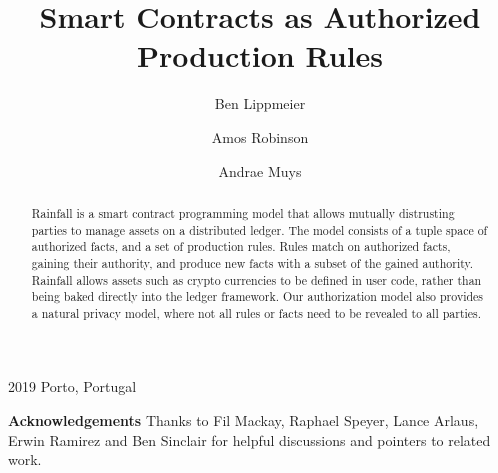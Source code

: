 \documentclass[format=sigconf, review=true, screen=true]{acmart}
\begin{document}
        {2019}
        {Porto, Portugal}

\title{Smart Contracts as Authorized Production Rules}

\author{Ben Lippmeier}

\author{Amos Robinson}

\author{Andrae Muys}

\begin{abstract}
Rainfall is a smart contract programming model that allows mutually distrusting parties to manage assets on a distributed ledger. The model consists of a tuple space of authorized facts, and a set of production rules. Rules match on authorized facts, gaining their authority, and produce new facts with a subset of the gained authority. Rainfall allows assets such as crypto currencies to be defined in user code, rather than being baked directly into the ledger framework. Our authorization model also provides a natural privacy model, where not all rules or facts need to be revealed to all parties.
\end{abstract}

\maketitle
\makeatactive









\textbf{Acknowledgements}
Thanks to Fil Mackay, Raphael Speyer, Lance Arlaus, Erwin Ramirez and Ben Sinclair for helpful discussions and pointers to related work.




\clearpage{}


\end{document}
